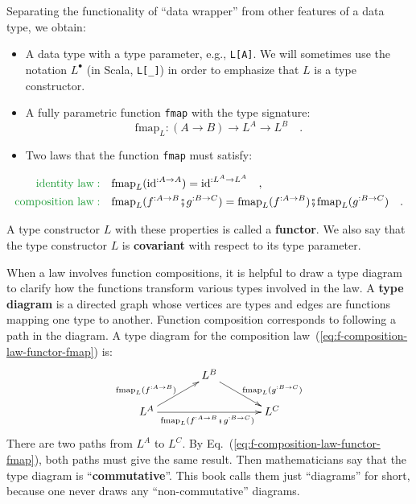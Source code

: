 Separating the functionality of \textsf{``}data wrapper\textsf{''} from other features
of a data type, we obtain:
\begin{itemize}
\item A data type with a type parameter, e.g., \lstinline!L[A]!. We will
sometimes use the notation $L^{\bullet}$ (in Scala, \lstinline!L[_]!)
in order to emphasize that $L$ is a type constructor.
\item A fully parametric function \lstinline!fmap!
with the type signature:
\[
\text{fmap}_{L}:\left(A\rightarrow B\right)\rightarrow L^{A}\rightarrow L^{B}\quad.
\]
\item Two laws that the function \lstinline!fmap! must satisfy:
\end{itemize}
\begin{align}
{\color{greenunder}\text{identity law}:}\quad & \text{fmap}_{L}(\text{id}^{:A\rightarrow A})=\text{id}^{:L^{A}\rightarrow L^{A}}\quad,\label{eq:f-identity-law-functor-fmap}\\
{\color{greenunder}\text{composition law}:}\quad & \text{fmap}_{L}(f^{:A\rightarrow B}\bef g^{:B\rightarrow C})=\text{fmap}_{L}(f^{:A\rightarrow B})\bef\text{fmap}_{L}(g^{:B\rightarrow C})\quad.\label{eq:f-composition-law-functor-fmap}
\end{align}

A type constructor $L$ with these properties is called a \textbf{functor}.
We also say that the type constructor $L$ is \textbf{covariant} with
respect to its type parameter.

When a law involves function compositions, it is helpful to draw a
type diagram to clarify how the functions transform
various types involved in the law. A \textbf{type diagram}
is a directed graph whose vertices are types and edges are functions
mapping one type to another. Function composition corresponds to following
a path in the diagram. A type diagram for the composition law~(\ref{eq:f-composition-law-functor-fmap})
is:
\[
\xymatrix{\xyScaleY{1.5pc}\xyScaleX{3pc} & L^{B}\ar[rd]\sp(0.6){~~\text{fmap}_{L}(g^{:B\rightarrow C})}\\
L^{A}\ar[ru]\sp(0.4){\text{fmap}_{L}(f^{:A\rightarrow B})\ ~}\ar[rr]\sb(0.5){\text{fmap}_{L}(f^{:A\rightarrow B}\bef g^{:B\rightarrow C})\ } &  & L^{C}
}
\]
There are two paths from $L^{A}$ to $L^{C}$. By Eq.~(\ref{eq:f-composition-law-functor-fmap}),
both paths must give the same result. Then mathematicians say that
the type diagram is \textsf{``}\textbf{commutative}\textsf{''}.
This book calls them just \textsf{``}diagrams\textsf{''} for short, because one never
draws any \textsf{``}non-commutative\textsf{''} diagrams.

